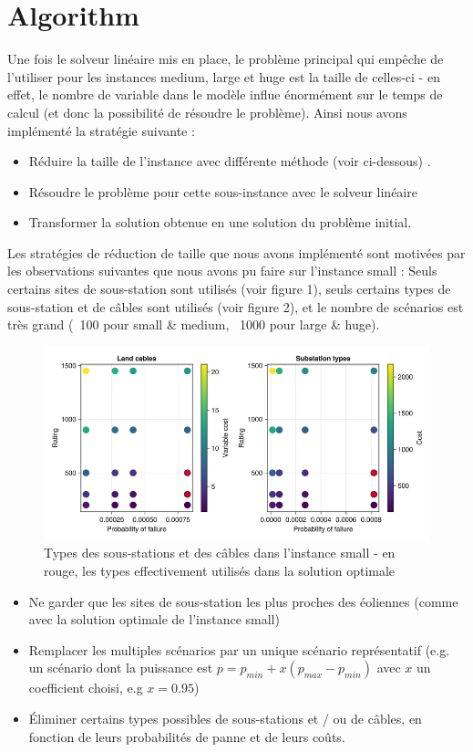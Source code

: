 \documentclass[a4paper,12pt]{article}
\begin{document}
\section {Algorithm}
Une fois le solveur linéaire mis en place, le problème principal qui empêche de l'utiliser pour les instances medium, large et huge est la taille de celles-ci - en effet, le nombre de variable dans le modèle influe énormément sur le temps de calcul (et donc la possibilité de résoudre le problème). 
Ainsi nous avons implémenté la stratégie suivante :
\\
\begin{itemize}
    \item Réduire la taille de l'instance avec différente méthode (voir ci-dessous) .
    \item Résoudre le problème pour cette sous-instance avec le solveur linéaire
    \item Transformer la solution obtenue en une solution du problème initial. \\
\end{itemize}
Les stratégies de réduction de taille que nous avons implémenté sont motivées par les observations suivantes que nous avons pu faire sur l'instance small :
Seuls certains sites de sous-station sont utilisés (voir figure 1), seuls certains types de sous-station et de câbles sont utilisés (voir figure 2), et le nombre de scénarios est très grand (~100 pour small \& medium, ~1000 pour large \& huge).

\begin{figure}[h]
    \centering
    \includegraphics[scale=0.4]{small-types.png}
    \caption{Types des sous-stations et des câbles dans l'instance small - en rouge, les types effectivement utilisés dans la solution optimale}
\end{figure}

\begin{itemize}
    \item Ne garder que les sites de sous-station les plus proches des éoliennes (comme avec la solution optimale de l'instance small)
    \item Remplacer les multiples scénarios par un unique scénario représentatif (e.g. un scénario dont la puissance est $p = p_{min} + x(p_{max} - p_{min})$ avec $x$ un coefficient choisi, e.g $x = 0.95$)
    \item Éliminer certains types possibles de sous-stations et / ou de câbles, en fonction de leurs probabilités de panne et de leurs coûts.
\end{itemize}
\end{document}
